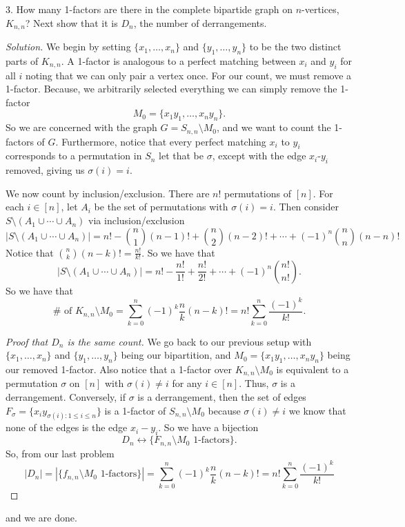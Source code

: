 \documentclass[12pt]{amsart}
\newenvironment{solution}
{\begin{proof}[Solution]}
{\end{proof}}
\begin{document}
\begin{onehalfspace}
        3. How many 1-factors are there in the complete bipartide graph on $n$-vertices, $K_{n,n}$?
        Next show that it is $D_n$, the number of derrangements.

        \begin{solution}
            We begin by setting $\{x_1,\ldots,x_n\}$ and $\{y_1,\ldots, y_n\}$ to be the two distinct parts
            of $K_{n,n}$.
            A 1-factor is analogous to a perfect matching between $x_i$ and $y_i$ for all $i$ noting that we can only
            pair a vertex once.
            For our count, we must remove a 1-factor.
            Because, we arbitrarily selected everything we can simply remove the 1-factor
            \[
                M_0=\{x_1 y_1,\ldots, x_n y_n\}.
            \]
            So we are concerned with the graph $G = S_{n,n}\setminus M_0$, and we want to count
            the 1-factors of $G$.
            Furthermore, notice that every perfect matching $x_i$ to $y_i$ corresponds to a permutation in $S_n$
            let that be $\sigma$, except with the edge $x_i$-$y_i$ removed, giving us $\sigma(i) = i$.

            We now count by inclusion/exclusion.
            There are $n!$ permutations of $[n]$.
            For each $i\in[n]$, let $A_i$ be the set of permutations with $\sigma(i)=i$.
            Then consider $S\setminus (A_1\cup\cdots\cup A_n)$ via inclusion/exclusion
            \[
                |S\setminus (A_1\cup\cdots\cup A_n)| = n! - \binom{n}{1}(n-1)! + \binom{n}{2}(n-2)! + \cdots + (-1)^n\binom{n}{n}(n-n)!
            \]
            Notice that $\binom{n}{k}(n-k)! = \frac{n!}{k!}$.
            So we have that
            \[
                |S\setminus (A_1\cup\cdots\cup A_n)| = n! -\frac{n!}{1!} + \frac{n!}{2!} + \cdots + (-1)^n\binom{n!}{n!}.
            \]
            So we have that
            \[
                \#\text{ of }K_{n,n}\setminus M_0 = \sum_{k=0}^n(-1)^k\frac{n}{k}(n-k)! = n!\sum_{k=0}^n \frac{(-1)^{k}}{k!}.
            \]

            \emph{Proof that $D_n$ is the same count.} We go back to our previous setup with $\{x_1,\ldots,x_n\}$ and $\{y_1,\ldots, y_n\}$
            being our bipartition, and $M_0 = \{x_1 y_1,\ldots,x_n y_n\}$ being our removed 1-factor.
            Also notice that a 1-factor over $K_{n,n}\setminus M_0$ is equivalent to a permutation $\sigma$
            on $[n]$ with $\sigma(i)\neq i$ for any $i\in[n]$.
            Thus, $\sigma$ is a derrangement.
            Conversely, if $\sigma$ is a derrangement, then the set of edges $F_\sigma = \{x_iy_{\sigma(i):1\le i\le n}\}$
            is a 1-factor of $S_{n,n}\setminus M_0$ because $\sigma(i)\neq i$ we know that none of the edges is the edge $x_i-y_i$.
            So we have a bijection
            \[
                D_n \leftrightarrow \{F_{n,n}\setminus M_0\text{ 1-factors}\}.
            \]
            So, from our last problem
            \[
                |D_n| = |\{ f_{n,n} \setminus M_0\text{ 1-factors}\}| = \sum_{k=0}^n(-1)^k\frac{n}{k}(n-k)! = n!\sum_{k=0}^n \frac{(-1)^{k}}{k!}
            \]
        \end{solution}
        and we are done.


    \end{onehalfspace}
\end{document}
